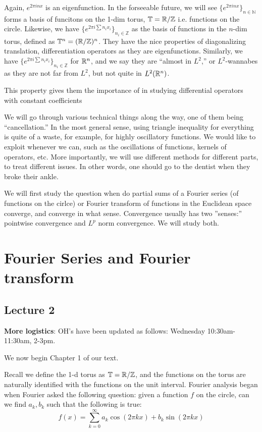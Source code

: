 Again, $e^{2\pi inx}$ is an eigenfunction. In the forseeable future, we will see $\{e^{2\pi inx}\}_{n\in\mathbb{N}}$ forms a basis of funcitons on the 1-dim torus, $\mathbb{T}=\mathbb{R}/\mathbb{Z}$ i.e. functions on the circle. Likewise, we have $\{e^{2\pi i\sum n_ix_i}\}_{n_i\in\mathbb{Z}}$ as the basis of functions in the $n$-dim torus, defined as $\mathbb{T}^n=(\mathbb{R}/\mathbb{Z})^n$. They have the nice properties of diagonalizing translation, differentiation operators as they are eigenfunctions. Similarly, we have $\{e^{2\pi i\sum n_ix_i}\}_{n_i\in\mathbb{Z}}$ for $\mathbb{R}^n$, and we say they are ``almost in $L^2$,'' or $L^2$-wannabes as they are not far from $L^2$, but not quite in $L^2(\mathbb{R}^n)$.

\begin{remark}
    This property gives them the importance of in studying differential operators with constant coefficients
\end{remark}

We will go through various technical things along the way, one of them being ``cancellation.'' In the most general sense, using triangle inequality for everything is quite of a waste, for example, for highly oscillatory functions. We would like to exploit whenever we can, such as the oscillations of functions, kernels of operators, etc. More importantly, we will use different methods for different parts, to treat different issues. In other words, one should go to the dentist when they broke their ankle.

We will  first study the question when do partial sums of a Fourier series (of functions on the cirlce) or Fourier transform of functions in the Euclidean space converge, and converge in what sense. Convergence usually has two ''senses:'' pointwise convergence and $L^p$ norm convergence. We will study both.

\newpage
\chapter{Fourier Series and Fourier transform}
\section{Lecture 2}
\textbf{More logistics}: OH's have been updated as follows: Wednesday 10:30am-11:30am, 2-3pm.

We now begin Chapter 1 of our text.

Recall we define the 1-d torus as $\mathbb{T}=\mathbb{R}/\mathbb{Z}$, and the functions on the torus are naturally identified with the functions on the unit interval. Fourier analysis began when Fourier asked the following question: given a function $f$ on the circle, can we find $a_k, b_k$ such that the following is true:
\begin{equation*}
    f(x)=\sum_{k=0}^\infty a_k\cos(2\pi kx)+b_k\sin(2\pi kx)
\end{equation*}

